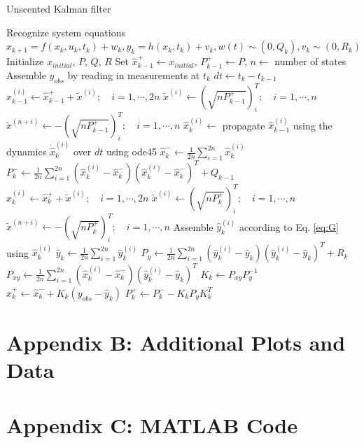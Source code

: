 \documentclass[letterpaper, paper,11pt]{AAS}	%
\begin{document}
\begin{algorithm}[H]
\footnotesize
\caption{Unscented Kalman filter}
\label{alg:UKF}
\begin{algorithmic}[1]
\State Recognize system equations $x_{k+1}=f(x_k,u_k,t_k)+w_k, y_k=h(x_k,t_k)+v_k, w(t)\sim(0,Q_k), v_k\sim(0,R_k)$
\State Initialize $x_{initial}$, $P$, $Q$, $R$
\State Set $\hat{x}_{k-1}^+ \gets x_{initial}$, $P_{k-1}^+ \gets P$, $n \gets$ number of states
    \State Assemble $y_{obs}$ by reading in measurements at $t_k$
    \State $dt \gets t_k - t_{k-1}$
    		\State $\hat{x}_{k-1}^{(i)} \gets \hat{x}_{k-1}^+ + \tilde{x}^{(i)}; \quad i=1,\cdots,2n$
    		\State $\tilde{x}^{(i)} \gets (\sqrt{nP_{k-1}^+})_i^T; \quad i=1,\cdots,n$
    		\State $\tilde{x}^{(n+i)} \gets -(\sqrt{nP_{k-1}^+})_i^T; \quad i=1,\cdots,n$
    	\EndFor
    \State $\hat{x}_k^{(i)} \gets$ propagate $\hat{x}_{k-1}^{(i)}$ using the dynamics $\dot{\hat{x}}_k^{(i)}$ over $dt$ using ode45
    \State $\hat{x}_k^- \gets \frac{1}{2n}\sum_{i=1}^{2n}\hat{x}_k^{(i)}$
    \State $P_k^- \gets \frac{1}{2n}\sum_{i=1}^{2n}(\hat{x}_k^{(i)}-\hat{x}_k^-)(\hat{x}_k^{(i)}-\hat{x}_k^-)^T + Q_{k-1}$
    		\State $\hat{x}_{k}^{(i)} \gets \hat{x}_{k}^+ + \tilde{x}^{(i)}; \quad i=1,\cdots,2n$
    		\State $\tilde{x}^{(i)} \gets (\sqrt{nP_{k}^+})_i^T; \quad i=1,\cdots,n$
    		\State $\tilde{x}^{(n+i)} \gets -(\sqrt{nP_{k}^+})_i^T; \quad i=1,\cdots,n$
    	\EndFor
    \State Assemble $\hat{y}_{k}^{(i)}$ according to Eq. \ref{eq:G} using $\hat{x}_k^{(i)}$
    \State $\hat{y}_k \gets \frac{1}{2n}\sum_{i=1}^{2n}\hat{y}_k^{(i)}$
    \State $P_y \gets \frac{1}{2n}\sum_{i=1}^{2n}(\hat{y}_k^{(i)}-\hat{y}_k)(\hat{y}_k^{(i)}-\hat{y}_k)^T + R_k$
    \State $P_{xy} \gets \frac{1}{2n}\sum_{i=1}^{2n}(\hat{x}_k^{(i)}-\hat{x}_k^-)(\hat{y}_k^{(i)}-\hat{y}_k)^T$
    \State $K_k \gets P_{xy}P_y^{-1}$
    \State $\hat{x}_k^+ \gets \hat{x}_k^- + K_k(y_{obs}-\hat{y}_k)$
    \State $P_k^+ \gets P_k^- - K_kP_yK_k^T$
\EndFor
\end{algorithmic}
\end{algorithm}

\section*{Appendix B: Additional Plots and Data}



\section*{Appendix C: MATLAB Code}
\inputminted[linenos=true, breaklines=true, breakanywhere=true, fontsize=\scriptsize]{MATLAB}{../extended_kalman_filter.m}
\inputminted[linenos=true, breaklines=true, breakanywhere=true, fontsize=\scriptsize]{MATLAB}{../unscented_kalman_filter.m}
\end{document}
